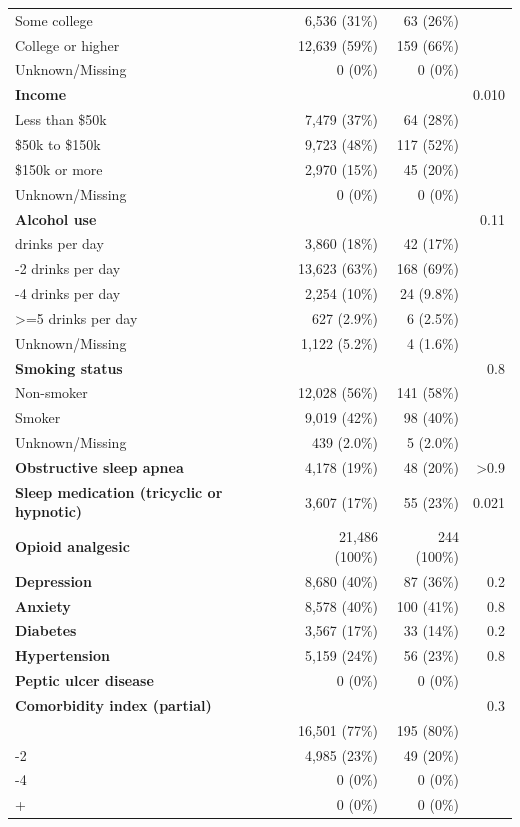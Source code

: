 \documentclass[11pt]{article}
\begin{document}
\begin{longtable}{@{}p{6.4cm}rrr@{}}
\quad Some college & 6,536 (31\%) & 63 (26\%) &  \\
\quad College or higher & 12,639 (59\%) & 159 (66\%) &  \\
\quad Unknown/Missing & 0 (0\%) & 0 (0\%) &  \\
\textbf{Income} &  &  & 0.010 \\
\quad Less than \$50k & 7,479 (37\%) & 64 (28\%) &  \\
\quad \$50k to \$150k & 9,723 (48\%) & 117 (52\%) &  \\
\quad \$150k or more & 2,970 (15\%) & 45 (20\%) &  \\
\quad Unknown/Missing & 0 (0\%) & 0 (0\%) &  \\
\textbf{Alcohol use} &  &  & 0.11 \\
\quad 0 drinks per day & 3,860 (18\%) & 42 (17\%) &  \\
\quad 1-2 drinks per day & 13,623 (63\%) & 168 (69\%) &  \\
\quad 3-4 drinks per day & 2,254 (10\%) & 24 (9.8\%) &  \\
\quad >=5 drinks per day & 627 (2.9\%) & 6 (2.5\%) &  \\
\quad Unknown/Missing & 1,122 (5.2\%) & 4 (1.6\%) &  \\
\textbf{Smoking status} &  &  & 0.8 \\
\quad Non-smoker & 12,028 (56\%) & 141 (58\%) &  \\
\quad Smoker & 9,019 (42\%) & 98 (40\%) &  \\
\quad Unknown/Missing & 439 (2.0\%) & 5 (2.0\%) &  \\
\textbf{Obstructive sleep apnea} & 4,178 (19\%) & 48 (20\%) & >0.9 \\
\textbf{Sleep medication (tricyclic or hypnotic)} & 3,607 (17\%) & 55 (23\%) & 0.021 \\
\textbf{Opioid analgesic} & 21,486 (100\%) & 244 (100\%) &  \\
\textbf{Depression} & 8,680 (40\%) & 87 (36\%) & 0.2 \\
\textbf{Anxiety} & 8,578 (40\%) & 100 (41\%) & 0.8 \\
\textbf{Diabetes} & 3,567 (17\%) & 33 (14\%) & 0.2 \\
\textbf{Hypertension} & 5,159 (24\%) & 56 (23\%) & 0.8 \\
\textbf{Peptic ulcer disease} & 0 (0\%) & 0 (0\%) &  \\
\textbf{Comorbidity index (partial)} &  &  & 0.3 \\
\quad 0 & 16,501 (77\%) & 195 (80\%) &  \\
\quad 1-2 & 4,985 (23\%) & 49 (20\%) &  \\
\quad 3-4 & 0 (0\%) & 0 (0\%) &  \\
\quad 5+ & 0 (0\%) & 0 (0\%) &  \\
\bottomrule \end{longtable}\normalsize
\end{document}
